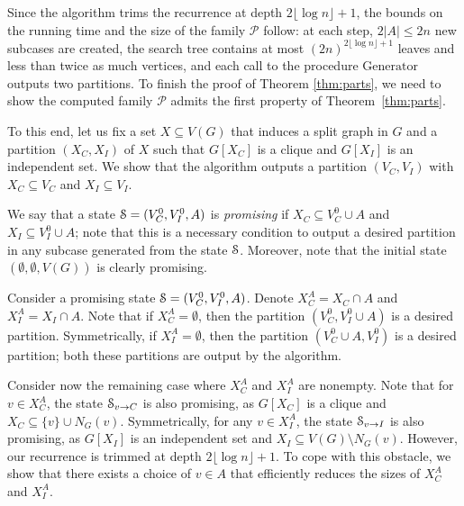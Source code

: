 \documentclass{article}
\theoremstyle{definition}
\begin{document}
Since the algorithm trims the recurrence at depth $2 \lfloor \log n \rfloor + 1$, the bounds on the running time
and the size of the family $\mathcal{P}$ follow: at each step, $2|A| \leq 2n$ new subcases are created,
the search tree contains at most $(2n)^{2\lfloor \log n \rfloor + 1}$ leaves and less than twice as much vertices,
and each call to the procedure $\mathrm{Generator}$ outputs two partitions.
To finish the proof of Theorem \ref{thm:parts}, we need to show the computed family $\mathcal{P}$
admits the first property of Theorem~\ref{thm:parts}.

To this end, let us fix a set $X \subseteq V(G)$ that induces a split graph in $G$ and a partition $(X_C,X_I)$
of $X$ such that $G[X_C]$ is a clique and $G[X_I]$ is an independent set. We show that the algorithm outputs
a partition $(V_C,V_I)$ with $X_C \subseteq V_C$ and $X_I \subseteq V_I$.

We say that a state $\mathcal{S} = (V_C^0,V_I^0,A)$ is {\em{promising}} if $X_C \subseteq V_C^0 \cup A$ and $X_I \subseteq V_I^0 \cup A$;
note that this is a necessary condition to output a desired partition in any subcase generated from the state $\mathcal{S}$.
Moreover, note that the initial state $(\emptyset,\emptyset,V(G))$ is clearly promising.

Consider a promising state $\mathcal{S} = (V_C^0,V_I^0,A)$.
Denote $X_C^A = X_C \cap A$ and $X_I^A = X_I \cap A$. Note that if $X_C^A = \emptyset$, then the
partition $(V_C^0, V_I^0 \cup A)$ is a desired partition. Symmetrically, if $X_I^A = \emptyset$, then the partition
$(V_C^0 \cup A, V_I^0)$ is a desired partition; both these partitions are output by the algorithm.

Consider now the remaining case where $X_C^A$ and $X_I^A$ are nonempty.
Note that for $v \in X_C^A$, the state
$\mathcal{S}_{v \to C}$ is also promising, as $G[X_C]$ is a clique and $X_C \subseteq \{v\} \cup N_G(v)$.
Symmetrically, for any $v \in X_I^A$, the state $\mathcal{S}_{v \to I}$ is also promising,
as $G[X_I]$ is an independent set and $X_I \subseteq V(G) \setminus N_G(v)$.
However, our recurrence is trimmed at depth $2 \lfloor \log n \rfloor + 1$.
To cope with this obstacle, we show that
there exists a choice of $v \in A$ that efficiently reduces the sizes of $X_C^A$ and $X_I^A$.
\end{document}
